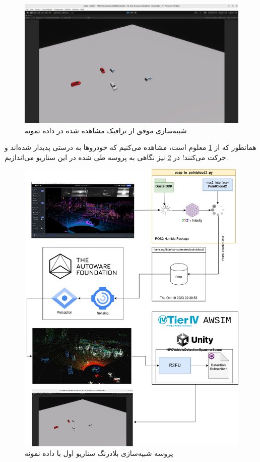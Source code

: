 \begin{figure}[h!]
    \centering
    \includegraphics[width=1\linewidth]{figures/NPCVehicleSimulation.png}
    \caption{شبیه‌سازی موفق از ترافیک مشاهده شده در داده نمونه}
    \label{fig:NPCVehicleSpawnerWithDetectionScene}
\end{figure}

همانطور که از \cref{fig:NPCVehicleSpawnerWithDetectionScene} معلوم است، مشاهده می‌کنیم که خودروها به درستی پدیدار شده‌اند و حرکت می‌کنند! در \cref{fig:SimulationProcess} نیز نگاهی به پروسه طی شده در این سناریو می‌اندازیم.

\begin{figure}[h!]
    \centering
    \includegraphics[width=1\linewidth]{figures/SimulationProcess.png}
    \caption{پروسه شبیه‌سازی بلادرنگ سناریو اول با داده نمونه}
    \label{fig:SimulationProcess}
\end{figure}

